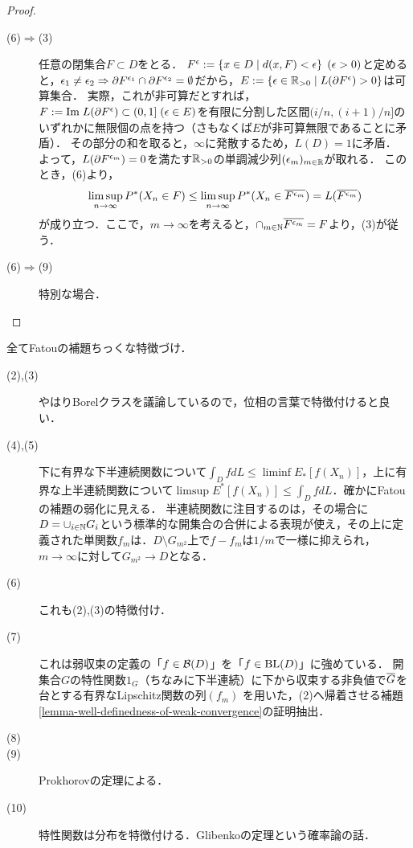 \documentclass[uplatex,dvipdfmx]{jsreport}
\begin{document}
\begin{proof}
\begin{description}
        \item[(6)$\Rightarrow$(3)]
        任意の閉集合$F\subset D$をとる．
        $F^\epsilon:=\left\{x\in D\mid d(x,F)<\epsilon\right\}\;(\epsilon>0)$と定めると，$\epsilon_1\ne\epsilon_2\Rightarrow\partial F^{\epsilon_1}\cap\partial F^{\epsilon_2}=\emptyset$だから，$E:=\left\{\epsilon\in\mathbb{R}_{>0}\mid L(\partial F^\epsilon)>0\right\}$は可算集合．
        実際，これが非可算だとすれば，$F:=\mathrm{Im}\; L(\partial F^\epsilon)\subset(0,1]\;(\epsilon\in E)$を有限に分割した区間$(i/n,(i+1)/n]$のいずれかに無限個の点を持つ（さもなくば$E$が非可算無限であることに矛盾）．
        その部分の和を取ると，$\infty$に発散するため，$L(D)=1$に矛盾．
        よって，$L(\partial F^{\epsilon_m})=0$を満たす$\mathbb{R}_{>0}$の単調減少列$(\epsilon_m)_{m\in\mathbb{R}}$が取れる．
        このとき，(6)より，
        \[\limsup_{n\to\infty}P^*(X_n\in F)\le\limsup_{n\to\infty}P^*(X_n\in\overline{F^{\epsilon_m}})=L(\overline{F^{\epsilon_m}})\]
        が成り立つ．ここで，$m\to\infty$を考えると，$\cap_{m\in\mathbb{N}}\overline{F^{\epsilon_m}}=F$より，(3)が従う．
        \item[(6)$\Rightarrow$(9)] 特別な場合．

    \end{description}
\end{proof}
\begin{remarks}
    全てFatouの補題ちっくな特徴づけ．
    \begin{description}
        \item[(2),(3)] 
        やはりBorelクラスを議論しているので，位相の言葉で特徴付けると良い．
        \item[(4),(5)] 下に有界な下半連続関数について$\int_DfdL\le\liminf E_*[f(X_n)]$，上に有界な上半連続関数について$\limsup E^*[f(X_n)]\le\int_DfdL$．確かにFatouの補題の弱化に見える．
        半連続関数に注目するのは，その場合に$D=\cup_{i\in\mathbb{N}}G_i$という標準的な開集合の合併による表現が使え，その上に定義された単関数$f_m$は．$D\setminus G_{m^2}$上で$f-f_m$は$1/m$で一様に抑えられ，$m\to\infty$に対して$G_{m^2}\to D$となる．
        \item[(6)]
        これも(2),(3)の特徴付け．
        \item[(7)] これは弱収束の定義の「$f\in\mathcal{B}(D)$」を「$f\in\mathrm{BL}(D)$」に強めている．
        開集合$G$の特性関数$1_G$（ちなみに下半連続）に下から収束する非負値で$\overline{G}$を台とする有界なLipschitz関数の列$(f_m)$
        を用いた，(2)へ帰着させる補題\ref{lemma-well-definedness-of-weak-convergence}の証明抽出．
        \item[(8)]

        \item[(9)] Prokhorovの定理による．

        \item[(10)] 特性関数は分布を特徴付ける．Glibenkoの定理という確率論の話．
    \end{description}
\end{remarks}
\end{document}
